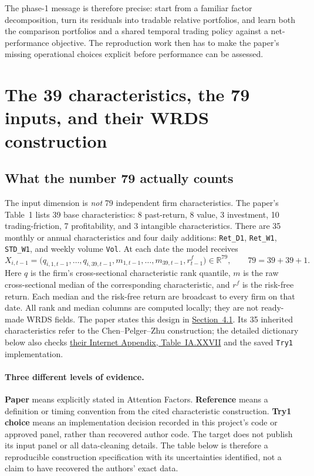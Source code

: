 \documentclass[11pt]{article}
\begin{document}
The phase-1 message is therefore precise: start from a familiar
factor decomposition, turn its residuals into tradable relative
portfolios, and learn both the comparison portfolios and a shared
temporal trading policy against a net-performance objective.
The reproduction work then has to make the paper's missing
operational choices explicit before performance can be assessed.


\section{The 39 characteristics, the 79 inputs, and their WRDS construction}
\label{app:characteristics}

\subsection{What the number 79 actually counts}
The input dimension is \emph{not} 79 independent firm characteristics. The paper's Table~1 lists 39 base characteristics: 8 past-return, 8 value, 3 investment, 10 trading-friction, 7 profitability, and 3 intangible characteristics. There are 35 monthly or annual characteristics and four daily additions: \texttt{Ret\_D1}, \texttt{Ret\_W1}, \texttt{STD\_W1}, and weekly volume \texttt{Vol}. At each date the model receives
\[
 X_{i,t-1}=\bigl(q_{i,1,t-1},\ldots,q_{i,39,t-1},
 m_{1,t-1},\ldots,m_{39,t-1},r^f_{t-1}\bigr)\in\mathbb R^{79},
 \qquad 79=39+39+1.
\]
Here $q$ is the firm's cross-sectional characteristic rank quantile, $m$ is the raw cross-sectional median of the corresponding characteristic, and $r^f$ is the risk-free return. Each median and the risk-free return are broadcast to every firm on that date. All rank and median columns are computed locally; they are not ready-made WRDS fields. The paper states this design in \href{https://arxiv.org/html/2510.11616v1}{Section~4.1}. Its 35 inherited characteristics refer to the Chen--Pelger--Zhu construction; the detailed dictionary below also checks \href{https://pubsonline.informs.org/doi/suppl/10.1287/mnsc.2023.4695/suppl_file/mnsc.2023.4695.sm1.pdf}{their Internet Appendix, Table~IA.XXVII} and the saved \texttt{Try1} implementation.

\paragraph{Three different levels of evidence.}
\textbf{Paper} means explicitly stated in Attention Factors. \textbf{Reference} means a definition or timing convention from the cited characteristic construction. \textbf{Try1 choice} means an implementation decision recorded in this project's code or approved panel, rather than recovered author code. The target does not publish its input panel or all data-cleaning details. The table below is therefore a reproducible construction specification with its uncertainties identified, not a claim to have recovered the authors' exact data.
\end{document}
